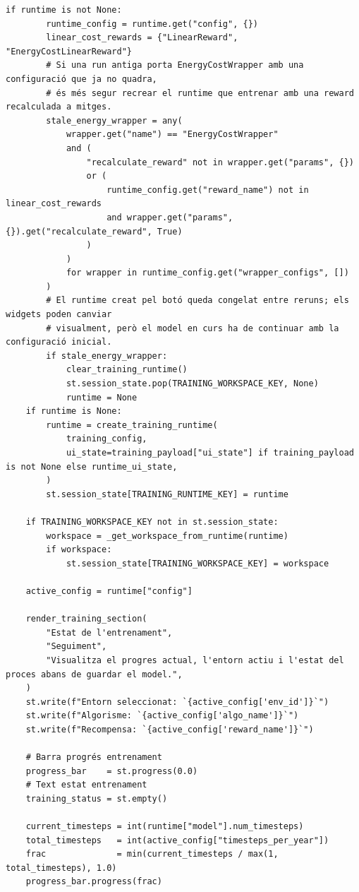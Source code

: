 \documentclass[10pt,a4paper]{article}
\begin{document}
\begin{lstlisting}[style=studioPython,caption={pages/Entrenar\_Agent.py},label={lst:pages-entrenar-agent-py}]
    if runtime is not None:
        runtime_config = runtime.get("config", {})
        linear_cost_rewards = {"LinearReward", "EnergyCostLinearReward"}
        # Si una run antiga porta EnergyCostWrapper amb una configuració que ja no quadra,
        # és més segur recrear el runtime que entrenar amb una reward recalculada a mitges.
        stale_energy_wrapper = any(
            wrapper.get("name") == "EnergyCostWrapper"
            and (
                "recalculate_reward" not in wrapper.get("params", {})
                or (
                    runtime_config.get("reward_name") not in linear_cost_rewards
                    and wrapper.get("params", {}).get("recalculate_reward", True)
                )
            )
            for wrapper in runtime_config.get("wrapper_configs", [])
        )
        # El runtime creat pel botó queda congelat entre reruns; els widgets poden canviar
        # visualment, però el model en curs ha de continuar amb la configuració inicial.
        if stale_energy_wrapper:
            clear_training_runtime()
            st.session_state.pop(TRAINING_WORKSPACE_KEY, None)
            runtime = None
    if runtime is None:
        runtime = create_training_runtime(
            training_config,
            ui_state=training_payload["ui_state"] if training_payload is not None else runtime_ui_state,
        )
        st.session_state[TRAINING_RUNTIME_KEY] = runtime

    if TRAINING_WORKSPACE_KEY not in st.session_state:
        workspace = _get_workspace_from_runtime(runtime)
        if workspace:
            st.session_state[TRAINING_WORKSPACE_KEY] = workspace

    active_config = runtime["config"]

    render_training_section(
        "Estat de l'entrenament",
        "Seguiment",
        "Visualitza el progres actual, l'entorn actiu i l'estat del proces abans de guardar el model.",
    )
    st.write(f"Entorn seleccionat: `{active_config['env_id']}`")
    st.write(f"Algorisme: `{active_config['algo_name']}`")
    st.write(f"Recompensa: `{active_config['reward_name']}`")

    # Barra progrés entrenament
    progress_bar    = st.progress(0.0)
    # Text estat entrenament
    training_status = st.empty()

    current_timesteps = int(runtime["model"].num_timesteps)
    total_timesteps   = int(active_config["timesteps_per_year"])
    frac              = min(current_timesteps / max(1, total_timesteps), 1.0)
    progress_bar.progress(frac)


\end{lstlisting}
\end{document}
